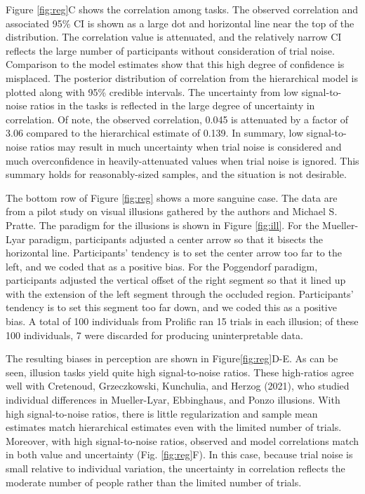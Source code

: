 \documentclass[
  ,man]{apa6}
\begin{document}
Figure \ref{fig:reg}C shows the correlation among tasks. The observed correlation and associated 95\% CI is shown as a large dot and horizontal line near the top of the distribution. The correlation value is attenuated, and the relatively narrow CI reflects the large number of participants without consideration of trial noise. Comparison to the model estimates show that this high degree of confidence is misplaced. The posterior distribution of correlation from the hierarchical model is plotted along with 95\% credible intervals. The uncertainty from low signal-to-noise ratios in the tasks is reflected in the large degree of uncertainty in correlation. Of note, the observed correlation, 0.045 is attenuated by a factor of 3.06 compared to the hierarchical estimate of 0.139. In summary, low signal-to-noise ratios may result in much uncertainty when trial noise is considered and much overconfidence in heavily-attenuated values when trial noise is ignored. This summary holds for reasonably-sized samples, and the situation is not desirable.

The bottom row of Figure \ref{fig:reg} shows a more sanguine case. The data are from a pilot study on visual illusions gathered by the authors and Michael S. Pratte. The paradigm for the illusions is shown in Figure \ref{fig:ill}. For the Mueller-Lyar paradigm, participants adjusted a center arrow so that it bisects the horizontal line. Participants' tendency is to set the center arrow too far to the left, and we coded that as a positive bias. For the Poggendorf paradigm, participants adjusted the vertical offset of the right segment so that it lined up with the extension of the left segment through the occluded region. Participants' tendency is to set this segment too far down, and we coded this as a positive bias. A total of 100 individuals from Prolific ran 15 trials in each illusion; of these 100 individuals, 7 were discarded for producing uninterpretable data.

The resulting biases in perception are shown in Figure\ref{fig:reg}D-E. As can be seen, illusion tasks yield quite high signal-to-noise ratios. These high-ratios agree well with Cretenoud, Grzeczkowski, Kunchulia, and Herzog (2021), who studied individual differences in Mueller-Lyar, Ebbinghaus, and Ponzo illusions. With high signal-to-noise ratios, there is little regularization and sample mean estimates match hierarchical estimates even with the limited number of trials. Moreover, with high signal-to-noise ratios, observed and model correlations match in both value and uncertainty (Fig. \ref{fig:reg}F). In this case, because trial noise is small relative to individual variation, the uncertainty in correlation reflects the moderate number of people rather than the limited number of trials.
\end{document}
